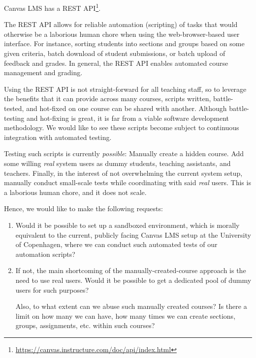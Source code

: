 \documentclass[a4paper]{article}
\begin{document}
\maketitle

\pagestyle{empty}

\bigskip

Canvas LMS has a REST
API\footnote{\url{https://canvas.instructure.com/doc/api/index.html}}.

\bigskip

The REST API allows for reliable automation (scripting) of tasks that would
otherwise be a laborious human chore when using the web-browser-based user
interface.  For instance, sorting students into sections and groups based on
some given criteria, batch download of student submissions, or batch upload of
feedback and grades. In general, the REST API enables automated course
management and grading.

Using the REST API is not straight-forward for all teaching staff, so to
leverage the benefits that it can provide across many courses, scripts written,
battle-tested, and hot-fixed on one course can be shared with another. Although
battle-testing and hot-fixing is great, it is far from a viable software
development methodology. We would like to see these scripts become subject to
continuous integration with automated testing.

Testing such scripts is currently \emph{possible}: Manually create a hidden
course. Add some willing \emph{real} system users as dummy students, teaching
assistants, and teachers. Finally, in the interest of not overwhelming the
current system setup, manually conduct small-scale tests while coordinating
with said \emph{real} users. This is a laborious human chore, and it does not
scale.

Hence, we would like to make the following requests:

\begin{enumerate}

\item Would it be possible to set up a sandboxed environment, which is morally
equivalent to the current, publicly facing Canvas LMS setup at the University
of Copenhagen, where we can conduct such automated tests of our automation
scripts?

\item If not, the main shortcoming of the manually-created-course approach is
the need to use real users. Would it be possible to get a dedicated pool of
dummy users for such purposes?

Also, to what extent can we abuse such manually created courses? Is there a
limit on how many we can have, how many times we can create sections, groups,
assignments, etc. within such courses?

\end{enumerate}
\end{document}
